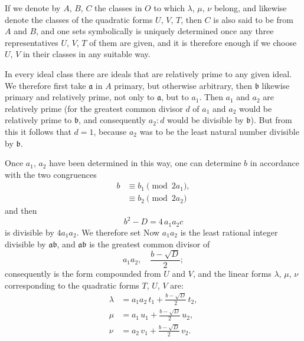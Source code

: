 If we denote by $A$, $B$, $C$ the classes in $O$ to which $\lambda$, $\mu$, $\nu$ belong, and likewise denote the classes of the quadratic forms $U$, $V$, $T$, then $C$ is also said to be  from $A$ and $B$, and one sets symbolically
 is uniquely determined once any three representatives $U$, $V$, $T$ of them are given, and it is therefore enough if we choose $U$, $V$ in their classes in any suitable way.

In every ideal class there are ideals that are relatively prime to any given ideal. We therefore first take $\mathfrak{a}$ in $A$ primary, but otherwise arbitrary, then $\mathfrak{b}$ likewise primary and relatively prime, not only to $\mathfrak{a}$, but to $a_1$. Then $a_1$ and $a_2$ are relatively prime (for the greatest common divisor $d$ of $a_1$ and $a_2$ would be relatively prime to $\mathfrak{b}$, and consequently $a_2 : d$ would be divisible by $\mathfrak{b}$). But from this it follows that $d=1$, because $a_2$ was to be the least natural number divisible by $\mathfrak{b}$.

Once $a_1$, $a_2$ have been determined in this way, one can determine $b$ in accordance with the two congruences
\[
\begin{aligned}
b &\equiv b_1 \pmod{2 a_1}, \\
&\equiv b_2 \pmod{2 a_2}
\end{aligned}
\]
and then
\[
b^2 - D = 4\,a_1 a_2 c
\]
is divisible by $4 a_1 a_2$. We therefore set
Now $a_1 a_2$ is the least rational integer divisible by $\mathfrak{a}\mathfrak{b}$, and $\mathfrak{a}\mathfrak{b}$ is the greatest common divisor of
\[
a_1 a_2, \quad \frac{b-\sqrt D}{2};
\]
consequently
is the form compounded from $U$ and $V$, and the linear forms $\lambda$, $\mu$, $\nu$ corresponding to the quadratic forms $T$, $U$, $V$ are:
\[
\begin{aligned}
\lambda &= a_1 a_2\,t_1 + \frac{b-\sqrt D}{2}\,t_2, \\
\mu &= a_1\,u_1 + \frac{b-\sqrt D}{2}\,u_2, \\
\nu &= a_2\,v_1 + \frac{b-\sqrt D}{2}\,v_2.
\end{aligned}
\]
